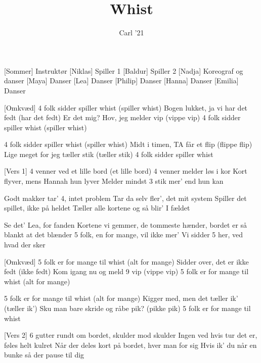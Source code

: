 \documentclass[a4paper,11pt]{article}
\title{Whist}
\author{Carl '21}
\begin{document}
\maketitle

\begin{roles}
[Sommer] Instruktør
[Niklas] Spiller 1
[Baldur] Spiller 2
[Nadja] Koreograf og danser
[Maya] Danser
[Lea] Danser
[Philip] Danser
[Hanna] Danser
[Emilia] Danser
\end{roles}


\begin{song}

[Omkvæd] 4 folk sidder spiller whist (spiller whist) 
    Bogen lukket, ja vi har det fedt (har det fedt)
    Er det mig? Hov, jeg melder vip (vippe vip)
    4 folk sidder spiller whist (spiller whist)

 4 folk sidder spiller whist (spiller whist) 
    Midt i timen, TA får et flip (flippe flip)
    Lige meget for jeg tæller stik (tæller stik)
    4 folk sidder spiller whist 

[Vers 1] 4 venner ved et lille bord (et lille bord)
    4 venner melder løs i kor
    Kort flyver, mens Hannah hun lyver
    Melder mindst 3 stik mer' end hun kan

 Godt makker tar' 4, intet problem
    Tar da selv fler', det mit system
    Spiller det spillet, ikke på heldet
    Tæller alle kortene og så blir' I fældet


 Se det' Lea, for fanden
    Kortene vi gemmer, de tommeste hænder, bordet er så blankt at det blænder
    5 folk, en for mange, vil ikke mer'
    Vi sidder 5 her, ved hvad der sker

[Omkvæd] 5 folk er for mange til whist (alt for mange)
    Sidder over, det er ikke fedt (ikke fedt)
    Kom igang nu og meld 9 vip (vippe vip)
    5 folk er for mange til whist (alt for mange)

 5 folk er for mange til whist (alt for mange)
    Kigger med, men det tæller ik' (tæller ik')
    Sku man bare skride og råbe pik? (pikke pik)
    5 folk er for mange til whist


[Vers 2] 6 gutter rundt om bordet, skulder mod skulder
    Ingen ved hvis tur det er, føles helt kulret
    Når der deles kort på bordet, hver man for sig
    Hvis ik' du når en bunke så der pause til dig


\end{song}
\end{document}
